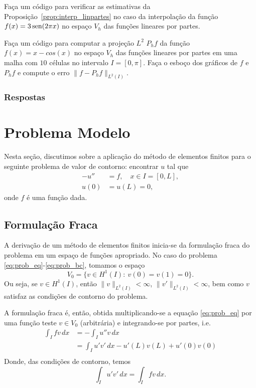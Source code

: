 \begin{exer}
  Faça um código para verificar as estimativas da Proposição~\ref{prop:interp_linpartes} no caso da interpolação da função $f(x) = 3\operatorname{sen}(2\pi x)$ no espaço $V_h$ das funções lineares por partes.
\end{exer}

\begin{exer}
  Faça um código para computar a projeção $L^2$ $P_hf$ da função $f(x) = x - cos(x)$ no espaço $V_h$ das funções lineares por partes em uma malha com $10$ células no intervalo $I = [0, \pi]$. Faça o esboço dos gráficos de $f$ e $P_hf$ e compute o erro $\|f-P_hf\|_{L^2(I)}$.
\end{exer}

\ifisbook
\subsubsection{Respostas}
\shipoutAnswer
\fi

\section{Problema Modelo}\label{cap_mef1d_sec_modelo}
\badgeRevisar

Nesta seção, discutimos sobre a aplicação do método de elementos finitos para o seguinte problema de valor de contorno: encontrar $u$ tal que
\begin{align}
  -u'' &= f,\quad x\in I=[0,L],\label{eq:prob_eq}\\
  u(0) &= u(L) = 0,\label{eq:prob_bc}
\end{align}
onde $f$ é uma função dada.

\subsection{Formulação Fraca}
\badgeRevisar

A derivação de um método de elementos finitos inicia-se da formulação fraca do problema em um espaço de funções apropriado. No caso do problema \eqref{eq:prob_eq}-\eqref{eq:prob_bc}, tomamos o espaço
\begin{equation}
  V_0 = \{v\in H^1(I):~v(0)=v(1)=0\}.
\end{equation}
Ou seja, se $v\in H^1(I)$, então $\|v\|_{L^2(I)}<\infty$, $\|v'\|_{L^2(I)}<\infty$, bem como $v$ satisfaz as condições de contorno do problema.

A formulação fraca é, então, obtida multiplicando-se a equação \eqref{eq:prob_eq} por uma função teste $v\in V_0$ (arbitrária) e integrando-se por partes, i.e.
\begin{align}
  \int_I fv\,dx &= -\int_I u''v\,dx\\
  &= \int_I u'v'\,dx - u'(L)v(L) + u'(0)v(0)\\
\end{align}
Donde, das condições de contorno, temos
\begin{equation}
  \int_I u'v'\,dx = \int_I fv\,dx.
\end{equation}

